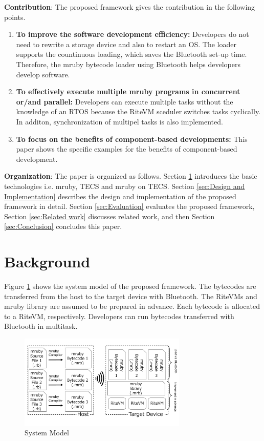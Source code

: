 \documentclass[conference,compsoc]{IEEEtran}
\begin{document}
{\bf Contribution}: The proposed framework gives the contribution in the following points.
\begin{enumerate}
    \item {\bf To improve the software development efficiency:} Developers do not need to rewrite a storage device and also to restart an OS.
The loader supports the countinuous loading, which saves the Bluetooth set-up time.
Therefore, the mruby bytecode loader using Bluetooth helps developers develop software.
\item {\bf To effectively execute multiple mruby programs in concurrent or/and parallel:} Developers can execute multiple tasks without the knowledge of an RTOS because the RiteVM sceduler switches tasks cyclically.
In additon, synchronization of multipel tasks is also implemented.
\item {\bf To focus on the benefits of component-based developments:} This paper shows the specific examples for the benefits of component-based development. 
\end{enumerate}

{\bf Organization}: The paper is organized as follows.
Section \ref{sec:Background} introduces the basic technologies i.e. mruby, TECS and mruby on TECS.
Section \ref{sec:Design and Implementation} describes the design and implementation of the proposed framework in detail.
Section \ref{sec:Evaluation} evaluates the proposed framework, Section \ref{sec:Related work} discusses related work, and then Section \ref{sec:Conclusion} concludes this paper.

\section{Background}
\label{sec:Background}
Figure \ref{fig:proposed} shows the system model of the proposed framework.
The bytecodes are transferred from the host to the target device with Bluetooth.
The RiteVMs and mruby library are assumed to be prepared in advance.
Each bytecode is allocated to a RiteVM, respectively.
Developers can run bytecodes transferred with Bluetooth in multitask.

\begin{figure}[t]
    \centering
    \includegraphics[width=8cm,clip]{figure/proposed.pdf}
    \caption{System Model}
    \label{fig:proposed}
\end{figure}
\end{document}
